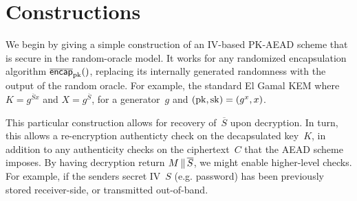 \section{Constructions}
\label{sec:constructions}
We begin by giving a simple construction of an IV-based PK-AEAD scheme that is secure in the random-oracle model. It works for any randomized encapsulation algorithm $\OLencapprim{\pk}{}$, replacing its internally generated randomness with the output of the random oracle.  For example, the standard El Gamal KEM where $K=g^{\overline{S}x}$ and $X=g^{\overline{S}}$, for a generator~$g$ and $(\mathrm{pk},\mathrm{sk})=(g^x,x)$.

This particular construction allows for recovery of~$\overline{S}$ upon decryption.  In turn, this allows a re-encryption authenticty check on the decapsulated key~$K$, in addition to any authenticity checks on the ciphertext~$C$ that the AEAD scheme imposes.      By having decryption return $M \,\|\, \overline{S}$, we might enable higher-level checks.  For example, if the senders secret IV~$S$ (e.g. password) has been previously stored receiver-side, or transmitted out-of-band. 


